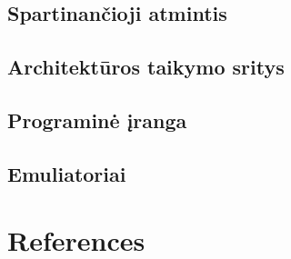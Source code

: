 \documentclass{article}
\begin{document}
\subsection{Spartinančioji atmintis}
\subsection{Architektūros taikymo sritys}
\subsection{Programinė įranga}
\subsection{Emuliatoriai}
\section{References}
\end{document}
